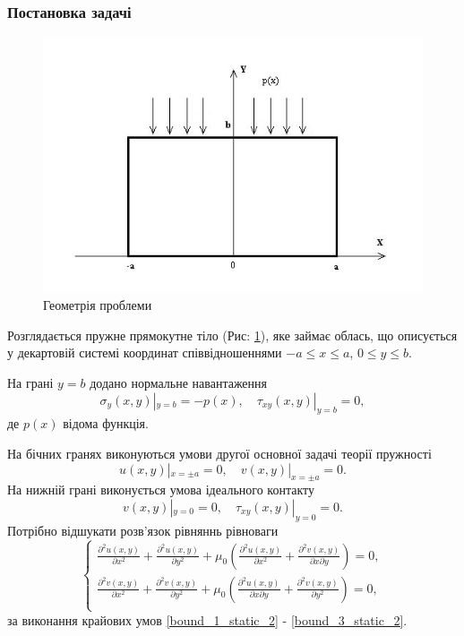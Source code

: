 \subsubsection{Постановка задачі}
\begin{figure}[ht!]
    \begin{center}
        \includegraphics[scale=1]{images/geometry/image_1.jpg}
    \end{center}
    \caption{Геометрія проблеми}\label{geom_static_2}
\end{figure}
Розглядається пружне прямокутне тіло (Рис: \ref{geom_static_2}), яке займає облась,
що описується у декартовій системі координат співвідношеннями $-a \le x \le a$, $0 \le y \le b$.

На грані $y=b$ додано нормальне навантаження
\begin{equation}\label{bound_1_static_2}
    \sigma_y(x, y) |_{y=b} = -p(x), \quad  \tau_{xy}(x,y) |_{y=b} =0,
\end{equation}
де $p(x)$ відома функція.

На бічних гранях виконуються умови другої основної задачі теорії пружності
\begin{equation}\label{bound_2_static_2}
    u(x,y) |_{x=\pm a} = 0, \quad v(x,y) |_{x=\pm a} =0.
\end{equation}
На нижній грані виконується умова ідеального контакту
\begin{equation}\label{bound_3_static_2}
    v(x,y) |_{y=0} = 0, \quad \tau_{xy}(x,y) |_{y=0} =0.
\end{equation}
Потрібно відшукати розв'язок рівняннь рівноваги
\begin{equation}\label{lame_static_2}
    \begin{cases}
        \frac{\partial^2 u(x,y)}{\partial x^2} + \frac{\partial^2 u(x,y)}{\partial y^2} + \mu_0 (\frac{\partial^2 u(x,y)}{\partial x^2} + \frac{\partial^2 v(x,y)}{\partial x\partial y}) = 0, \\
        \frac{\partial^2 v(x,y)}{\partial x^2} + \frac{\partial^2 v(x,y)}{\partial y^2} + \mu_0 (\frac{\partial^2 u(x,y)}{\partial x \partial y} + \frac{\partial^2 v(x,y)}{\partial y^2}) = 0, \\
    \end{cases}
\end{equation}
за виконання крайових умов \eqref{bound_1_static_2} - \eqref{bound_3_static_2}.

